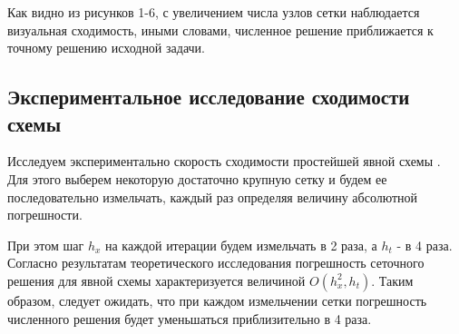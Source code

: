 {{%
%
%

Как видно из рисунков 1-6, с увеличением числа узлов сетки наблюдается визуальная сходимость, иными словами, численное решение приближается к точному решению исходной задачи.

\subsection{Экспериментальное исследование сходимости схемы}{
Исследуем экспериментально скорость сходимости простейшей явной схемы . Для
этого выберем некоторую достаточно крупную сетку и будем ее последовательно
измельчать, каждый раз определяя величину абсолютной погрешности. 

При этом шаг $h_x$ на каждой итерации будем измельчать в 2 раза, а $h_t$ - в 4 раза. Согласно результатам
теоретического исследования погрешность сеточного решения для явной схемы
характеризуется величиной $O(h_x^2, h_t)$. Таким образом, следует ожидать, что при
каждом измельчении сетки погрешность численного решения
будет уменьшаться приблизительно в 4 раза.

%
%		
%		
%		 	

}}}
